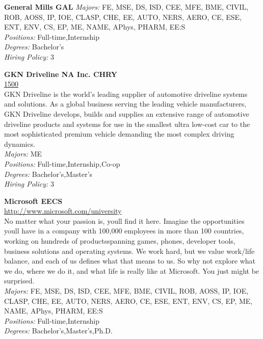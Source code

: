 \documentclass[twoside]{article}
\begin{document}
\begin{center}
\begin{multicols}{2}
\begin{minipage}{.95\columnwidth}{\Large\bf General Mills \hfill GAL}
    \emph{Majors:} FE, MSE, DS, ISD, CEE, MFE, BME, CIVIL, ROB, AOSS, IP, IOE, CLASP, CHE, EE, AUTO, NERS, AERO, CE, ESE, ENT, ENV, CS, EP, ME, NAME, APhys, PHARM, EE:S\\
    \emph{Positions:} Full-time,Internship\\
    \emph{Degrees:} Bachelor's\\
    \emph{Hiring Policy:} 3\\
\end{minipage}
 \begin{minipage}{.95\columnwidth}{\Large\bf GKN Driveline NA Inc. \hfill CHRY}\\
    \url{1500}\\
    GKN Driveline is the world's leading supplier of automotive driveline systems and solutions. As a global business serving the leading vehicle manufacturers, GKN Driveline develops, builds and supplies an extensive range of automotive driveline products and systems for use in the smallest ultra low-cost car to the most sophisticated premium vehicle demanding the most complex driving dynamics.\\
    \emph{Majors:} ME\\
    \emph{Positions:} Full-time,Internship,Co-op\\
    \emph{Degrees:} Bachelor's,Master's\\
    \emph{Hiring Policy:} 3\\
\end{minipage}
 \begin{minipage}{.95\columnwidth}{\Large\bf Microsoft \hfill EECS}\\
    \url{http://www.microsoft.com/university}\\
    No matter what your passion is, youll find it here. Imagine the opportunities youll have in a company with 100,000 employees in more than 100 countries, working on hundreds of productsspanning games, phones, developer tools, business solutions and operating systems. We work hard, but we value work/life balance, and each of us defines what that means to us. So why not explore what we do, where we do it, and what life is really like at Microsoft. You just might be surprised.\\
    \emph{Majors:} FE, MSE, DS, ISD, CEE, MFE, BME, CIVIL, ROB, AOSS, IP, IOE, CLASP, CHE, EE, AUTO, NERS, AERO, CE, ESE, ENT, ENV, CS, EP, ME, NAME, APhys, PHARM, EE:S\\
    \emph{Positions:} Full-time,Internship\\
    \emph{Degrees:} Bachelor's,Master's,Ph.D.\\

\end{minipage}
\end{multicols}
\end{center}
\end{document}
